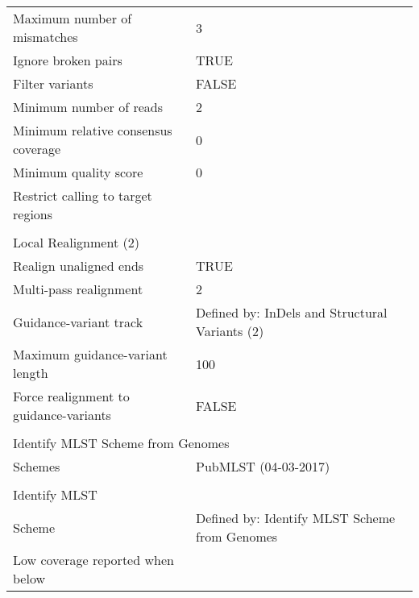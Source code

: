 \begin{longtable}{ll}
Maximum number of mismatches                 & 3                                              \\
Ignore broken pairs                          & TRUE                                           \\
Filter variants                              & FALSE                                          \\
Minimum number of reads                      & 2                                              \\
Minimum relative consensus coverage          & 0                                              \\
Minimum quality score                        & 0                                              \\
Restrict calling to target regions           &                                                \\
                                             &                                                \\
Local Realignment (2)                        &                                                \\
Realign unaligned ends                       & TRUE                                           \\
Multi-pass realignment                       & 2                                              \\
Guidance-variant track                       & Defined by: InDels and Structural Variants (2) \\
Maximum guidance-variant length              & 100                                            \\
Force realignment to guidance-variants       & FALSE                                          \\
                                             &                                                \\
\multicolumn{2}{l}{Identify MLST Scheme from Genomes}                                         \\
Schemes                                      & PubMLST (04-03-2017)                           \\
                                             &                                                \\
Identify MLST                                &                                                \\
Scheme                                       & Defined by: Identify MLST Scheme from Genomes  \\
Low coverage reported when below             &                                               
\end{longtable}
